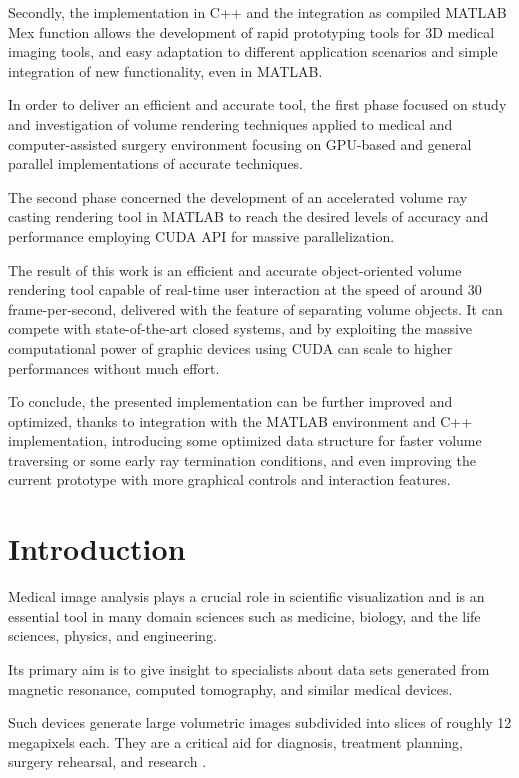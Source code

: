 \documentclass[12pt,a4paper]{extarticle}
\begin{document}
Secondly, the implementation in C++ and the integration as compiled MATLAB Mex function allows the development of rapid prototyping tools for 3D medical imaging tools, and easy adaptation to different application scenarios and simple integration of new functionality, even in MATLAB.

In order to deliver an efficient and accurate tool, the first phase focused on study and investigation of volume rendering techniques applied to medical and computer-assisted surgery environment focusing on GPU-based and general parallel implementations of accurate techniques.

The second phase concerned the development of an accelerated volume ray casting rendering tool in MATLAB to reach the desired levels of accuracy and performance employing CUDA API for massive parallelization. 

The result of this work is an efficient and accurate object-oriented volume rendering tool capable of real-time user interaction at the speed of around 30 frame-per-second, delivered with the feature of separating volume objects.
It can compete with state-of-the-art closed systems, and by exploiting the massive computational power of graphic devices using CUDA can scale to higher performances without much effort.

To conclude, the presented implementation can be further improved and optimized, thanks to integration with the MATLAB environment and C++ implementation, introducing some optimized data structure for faster volume traversing or some early ray termination conditions, and even improving the current prototype with more graphical controls and interaction features. 

   
\pagebreak
\tableofcontents
\pagebreak

\section*{Introduction} 
Medical image analysis plays a crucial role in scientific visualization and is an essential tool in many domain sciences such as medicine, biology, and the life sciences, physics, and engineering.

Its primary aim is to give insight to specialists about data sets generated from magnetic resonance, computed tomography, and similar medical devices.

Such devices generate large volumetric images subdivided into slices of roughly 12 megapixels each. They are a critical aid for diagnosis, treatment planning, surgery rehearsal, and research \cite{VISINMED:1}.
\end{document}
